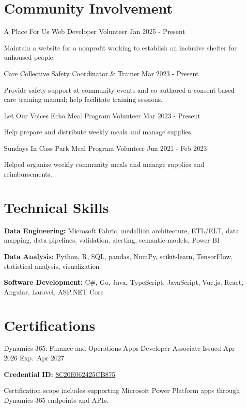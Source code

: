 \documentclass{../styles/cv}
\begin{document}
\section{Community Involvement}

\subsectionpositiondate
    {A Place For Us}
    {Web Developer Volunteer}
    {Jan 2025 - Present}
\resumesublistbegin
    \item Maintain a website for a nonprofit working to establish an inclusive shelter for unhoused people.
\resumesublistend

\subsectionpositiondate
    {Care Collective}
    {Safety Coordinator \& Trainer}
    {Mar 2023 - Present}
\resumesublistbegin
    \item Provide safety support at community events and co-authored a consent-based care training manual; help facilitate training sessions.
\resumesublistend

\subsectionpositiondate
    {Let Our Voices Echo}
    {Meal Program Volunteer}
    {Mar 2023 - Present}
\resumesublistbegin
    \item Help prepare and distribute weekly meals and manage supplies.
\resumesublistend

\subsectionpositiondate
    {Sundays In Cass Park}
    {Meal Program Volunteer}
    {Jun 2021 - Feb 2023}
\resumesublistbegin
    \item Helped organize weekly community meals and manage supplies and reimbursements.
\resumesublistend

\section{Technical Skills}
\resumesublistbegin
    \item \textbf{Data Engineering:} Microsoft Fabric, medallion architecture, ETL/ELT, data mapping, data pipelines, validation, alerting, semantic models, Power BI
    \item \textbf{Data Analysis:} Python, R, SQL, pandas, NumPy, scikit-learn, TensorFlow, statistical analysis, visualization
    \item \textbf{Software Development:} C\#, Go, Java, TypeScript, JavaScript, Vue.js, React, Angular, Laravel, ASP.NET Core
\resumesublistend

\section{Certifications}
\subsectiondate
    {Dynamics 365: Finance and Operations Apps Developer Associate}
    {Issued Apr 2026 \textperiodcentered{} Exp.\ Apr 2027}
\resumesublistbegin
    \item \textbf{Credential ID:} \href{https://learn.microsoft.com/en-us/users/marvinkassabian-5833/credentials/8c20e062425cb875}{8C20E062425CB875}
    \item Certification scope includes supporting Microsoft Power Platform apps through Dynamics 365 endpoints and APIs.
\resumesublistend
\end{document}
